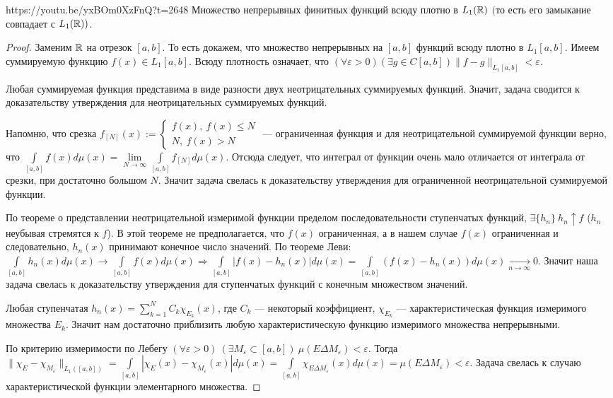 \begin{linklm}{https://youtu.be/yxBOm0XzFnQ?t=2648}
	Множество\label{lemma_12.1.1} непрерывных финитных функций всюду плотно в $L_1(\mathbb{R})$ $($то есть его замыкание совпадает с $L_1(\mathbb{R}))$.
\end{linklm}
\begin{proof}
	Заменим $\mathbb{R}$ на отрезок $[a,b]$. То есть докажем, что множество непрерывных на $[a,b]$ функций всюду плотно в $L_1[a,b]$. Имеем суммируемую функцию $f(x)\in L_1[a,b]$. Всюду плотность означает, что ${(\forall\varepsilon >0)} {(\exists g\in C[a,b])} \parallel f-g\parallel_{L_1[a,b]}<\varepsilon$.
	
  Любая суммируемая функция представима в виде разности двух неотрицательных суммируемых функций. Значит, задача сводится к доказательству утверждения для неотрицательных суммируемых функций.
 
 Напомню, что срезка $f_{[N]} (x) := \begin{cases}
 	f(x),\ f(x)\leqslant N\\
 	N,\ f(x) > N
 \end{cases}$ --- ограниченная функция и для неотрицательной суммируемой функции верно, что $\int\limits_{[a,b]}f(x)d\mu(x)=\lim\limits_{N\to\infty}\int\limits_{[a,b]}f_{[N]}d\mu(x)$.  Отсюда следует, что интеграл от функции очень мало отличается от интеграла от срезки, при достаточно большом $N$. Значит задача свелась к доказательству утверждения для ограниченной неотрицательной суммируемой функции.
 
 По теореме о представлении неотрицательной измеримой функции пределом последовательности ступенчатых функций, $\exists \{h_n\}\  h_n \uparrow f$ ($h_n$ неубывая стремятся к $f$). В этой теореме не предполагается, что $f(x)$ ограниченная, а в нашем случае $f(x)$ ограниченная и следовательно, $h_n(x)$ принимают конечное число значений. По теореме Леви: 
		$	\int\limits_{[a,b]} h_n(x)d\mu(x)\rightarrow \int\limits_{[a,b]}f(x)d\mu(x)\Rightarrow
			\int\limits_{[a,b]}|f(x)-h_n(x)|d\mu(x)=\int\limits_{[a,b]}(f(x)-h_n(x))d\mu(x)\underset{n\to\infty}{\to}0.$
Значит наша задача свелась к доказательству утверждения для ступенчатых функций с конечным множеством значений.

Любая ступенчатая $h_n(x)=\sum\limits_{k=1}^N C_k\chi_{E_k}(x)$, где $C_k$ --- некоторый коэффициент, $\chi_{E_k}$ --- характеристическая функция измеримого множества $E_k$. Значит нам достаточно приблизить любую характеристическую функцию измеримого множества непрерывными.
		
По критерию измеримости по Лебегу $(\forall\varepsilon>0)\ (\exists M_\varepsilon\subset[a,b])\  \mu(E\Delta M_\varepsilon)<\varepsilon$. Тогда ${\parallel \chi_E - \chi_{M_\varepsilon}\parallel_{L_1([a,b])}=\int\limits_{[a,b]}|\chi_{E}(x)-\chi_{M_\varepsilon}(x)|d\mu(x)=\int\limits_{[a,b]}\chi_{E\Delta M_\varepsilon}(x)d\mu(x)=\mu(E\Delta M_\varepsilon)<\varepsilon}$. Задача свелась к случаю характеристической функции элементарного множества.
		

\end{proof}
